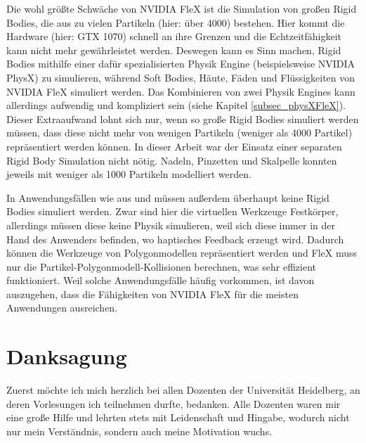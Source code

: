 Die wohl größte Schwäche von NVIDIA FleX ist die Simulation von großen Rigid Bodies, die aus zu vielen Partikeln (hier: über 4000) bestehen. Hier kommt die Hardware (hier: GTX 1070) schnell an ihre Grenzen und die Echtzeitfähigkeit kann nicht mehr gewährleistet werden. 
Deswegen kann es Sinn machen, Rigid Bodies mithilfe einer dafür spezialisierten Physik Engine (beispielsweise NVIDIA PhysX) zu simulieren, während Soft Bodies, Häute, Fäden und Flüssigkeiten von NVIDIA FleX simuliert werden. Das Kombinieren von zwei Physik Engines kann allerdings aufwendig  und kompliziert sein (siehe Kapitel \ref{subsec_physXFleX}).
Dieser Extraaufwand lohnt sich nur, wenn so große Rigid Bodies simuliert werden müssen, dass diese nicht mehr von wenigen Partikeln (weniger als 4000 Partikel) repräsentiert werden können. 
In dieser Arbeit war der Einsatz einer separaten Rigid Body Simulation nicht nötig. Nadeln, Pinzetten und Skalpelle konnten jeweils mit weniger als 1000 Partikeln modelliert werden. 

In Anwendungsfällen wie aus \cite{VRSim20} und \cite{VRmagic} müssen außerdem überhaupt keine Rigid Bodies simuliert werden. Zwar sind hier die virtuellen Werkzeuge Festkörper, allerdings müssen diese keine Physik simulieren, weil sich diese immer in der Hand des Anwenders befinden, wo haptisches Feedback erzeugt wird. Dadurch können die Werkzeuge von Polygonmodellen repräsentiert werden und FleX muss nur die Partikel-Polygonmodell-Kollisionen berechnen, was sehr effizient funktioniert. Weil solche Anwendungsfälle häufig vorkommen, ist davon auszugehen, dass die Fähigkeiten von NVIDIA FleX für die meisten Anwendungen ausreichen.











\chapter*{Danksagung}
Zuerst möchte ich mich herzlich bei allen Dozenten der Universität Heidelberg, an deren Vorlesungen ich teilnehmen durfte, bedanken. Alle Dozenten waren mir eine große Hilfe und lehrten stets mit Leidenschaft und Hingabe, wodurch nicht nur mein Verständnis, sondern auch meine Motivation wuchs.

